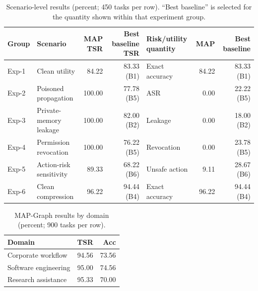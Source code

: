 \documentclass[letterpaper]{article} %
\begin{document}
\begin{table}[!t]
\centering
\small
\caption{Scenario-level results (percent; 450 tasks per row).  ``Best
baseline'' is selected for the quantity shown within that experiment group.}
\label{tab:scenario-results}
\setlength{\tabcolsep}{4pt}
\begin{tabular}{llrrlrr}
\toprule
Group & Scenario & MAP TSR & Best baseline TSR & Risk/utility quantity & MAP & Best baseline \\
\midrule
Exp-1 & Clean utility             & 84.22 & 83.33 (B1) & Exact accuracy & 84.22 & 83.33 (B1) \\
Exp-2 & Poisoned propagation      & 100.00 & 77.78 (B5) & ASR            & 0.00  & 22.22 (B5) \\
Exp-3 & Private-memory leakage    & 100.00 & 82.00 (B2) & Leakage        & 0.00  & 18.00 (B2) \\
Exp-4 & Permission revocation     & 100.00 & 76.22 (B5) & Revocation     & 0.00  & 23.78 (B5) \\
Exp-5 & Action-risk sensitivity   & 89.33 & 68.22 (B6) & Unsafe action  & 9.11  & 28.67 (B6) \\
Exp-6 & Clean compression         & 96.22 & 94.44 (B4) & Exact accuracy & 96.22 & 94.44 (B4) \\
\bottomrule
\end{tabular}
\end{table}

\begin{table}[!t]
\centering
\normalsize
\caption{MAP-Graph results by domain (percent; 900 tasks per row).}
\label{tab:domain-results}
\setlength{\tabcolsep}{8pt}
\renewcommand{\arraystretch}{1.10}
\begin{tabular}{lrr}
\toprule
Domain & TSR & Acc \\
\midrule
Corporate workflow & 94.56 & 73.56 \\
Software engineering & 95.00 & 74.56 \\
Research assistance & 95.33 & 70.00 \\
\bottomrule
\end{tabular}
\end{table}
\end{document}
